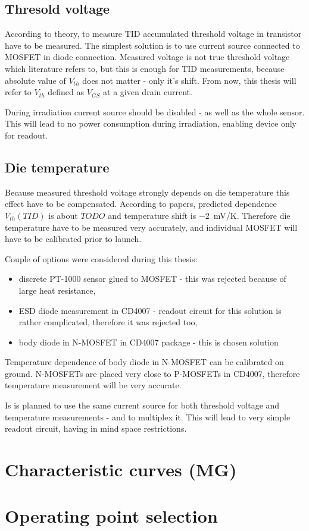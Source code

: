     \subsection{Thresold voltage}
        According to theory, to measure TID accumulated threshold voltage in transistor have to be measured. The simplest solution is to use current source connected to MOSFET in diode connection. Measured voltage is not true threshold voltage which literature refers to, but this is enough for TID measurements, because absolute value of $V_{th}$ does not matter - only it's shift. From now, this thesis will refer to $V_{th}$ defined as $V_{GS}$ at a given drain current.

        During irradiation current source should be disabled - as well as the whole sensor. This will lead to no power consumption during irradiation, enabling device only for readout.

    \subsection{Die temperature}
        Because measured threshold voltage strongly depends on die temperature this effect have to be compensated. According to papers, predicted dependence $V_{th}(TID)$ is about $TODO$ and temperature shift is \SI{-2}{\milli\volt/\kelvin}. Therefore die temperature have to be measured very accurately, and individual MOSFET will have to be calibrated prior to launch.

        Couple of options were considered during this thesis:
        \begin{itemize}
            \item discrete PT-1000 sensor glued to MOSFET - this was rejected because of large heat resistance,
            \item ESD diode measurement in CD4007 - readout circuit for this solution is rather complicated, therefore it was rejected too,
            \item body diode in N-MOSFET in CD4007 package - this is chosen solution
        \end{itemize}

        Temperature dependence of body diode in N-MOSFET can be calibrated on ground. N-MOSFETs are placed very close to P-MOSFETs in CD4007, therefore temperature measurement will be very accurate.

        Is is planned to use the same current source for both threshold voltage and temperature measurements - and to multiplex it. This will lead to very simple readout circuit, having in mind space restrictions.

\section{Characteristic curves (MG)}
\section{Operating point selection}

